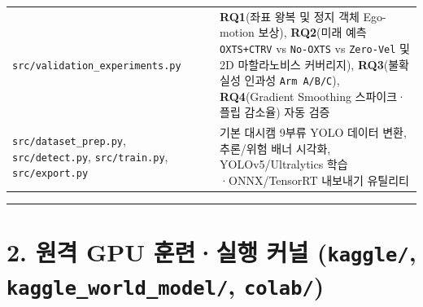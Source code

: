 \documentclass[10.5pt,a4paper]{article}
\begin{document}
\begin{footnotesize}
\begin{longtable}{>{\raggedright\arraybackslash}p{} >{\raggedright\arraybackslash}p{} >{\raggedright\arraybackslash}p{}}
\texttt{src/\allowbreak{}validation\_\allowbreak{}experiments.\allowbreak{}py} & 499 & \textbf{RQ1}(좌표 왕복 및 정지 객체 Ego-motion 보상), \textbf{RQ2}(미래 예측 \texttt{OXTS+CTRV} vs \texttt{No-\allowbreak{}OXTS} vs \texttt{Zero-\allowbreak{}Vel} 및 2D 마할라노비스 커버리지), \textbf{RQ3}(불확실성 인과성 \texttt{Arm A/\allowbreak{}B/\allowbreak{}C}), \textbf{RQ4}(Gradient Smoothing 스파이크·플립 감소율) 자동 검증 \\
\texttt{src/\allowbreak{}dataset\_\allowbreak{}prep.\allowbreak{}py}, \texttt{src/\allowbreak{}detect.\allowbreak{}py}, \texttt{src/\allowbreak{}train.\allowbreak{}py}, \texttt{src/\allowbreak{}export.\allowbreak{}py} & 377 & 기본 대시캠 9부류 YOLO 데이터 변환, 추론/위험 배너 시각화, YOLOv5/Ultralytics 학습·ONNX/TensorRT 내보내기 유틸리티 \\
\end{longtable}
\end{footnotesize}


\par\noindent\rule{\textwidth}{0.4pt}\par\medskip

\section{2. 원격 GPU 훈련·실행 커널 (\texttt{kaggle/\allowbreak{}}, \texttt{kaggle\_\allowbreak{}world\_\allowbreak{}model/\allowbreak{}}, \texttt{colab/\allowbreak{}})}
\end{document}
